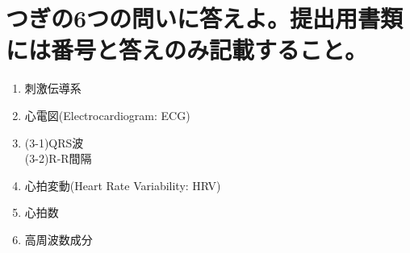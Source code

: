 \documentclass[titlepage,a4paper]{jsarticle}
\begin{document}
\section{つぎの6つの問いに答えよ。提出用書類には番号と答えのみ記載すること。}%
\begin{enumerate}
  \item 刺激伝導系
  \item 心電図(Electrocardiogram: ECG)
  \item (3-1)QRS波\\
        (3-2)R-R間隔
  \item 心拍変動(Heart Rate Variability: HRV)
  \item 心拍数
  \item 高周波数成分
\end{enumerate}
\begin{thebibliography}{99}
  \bibitem{}
\end{thebibliography}
\end{document}
